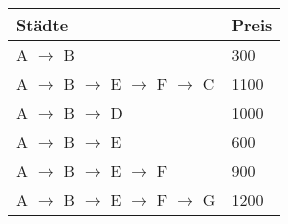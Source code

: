 \documentclass{bschlangaul-aufgabe}
\begin{document}
\noindent
\begin{tabular}{|l|l|}
\hline
Städte & Preis\\\hline\hline
A $\rightarrow$ B & 300 \\\hline
A $\rightarrow$ B $\rightarrow$ E $\rightarrow$ F $\rightarrow$ C & 1100 \\\hline
A $\rightarrow$ B $\rightarrow$ D & 1000 \\\hline
A $\rightarrow$ B $\rightarrow$ E & 600 \\\hline
A $\rightarrow$ B $\rightarrow$ E $\rightarrow$ F & 900 \\\hline
A $\rightarrow$ B $\rightarrow$ E $\rightarrow$ F $\rightarrow$ G & 1200 \\\hline
\end{tabular}
\end{document}
